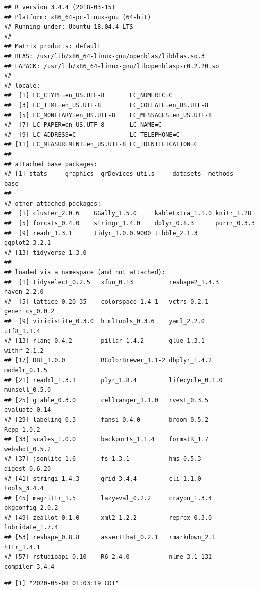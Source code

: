 \documentclass[]{article}
\begin{document}
\begin{verbatim}
## R version 3.4.4 (2018-03-15)
## Platform: x86_64-pc-linux-gnu (64-bit)
## Running under: Ubuntu 18.04.4 LTS
## 
## Matrix products: default
## BLAS: /usr/lib/x86_64-linux-gnu/openblas/libblas.so.3
## LAPACK: /usr/lib/x86_64-linux-gnu/libopenblasp-r0.2.20.so
## 
## locale:
##  [1] LC_CTYPE=en_US.UTF-8       LC_NUMERIC=C              
##  [3] LC_TIME=en_US.UTF-8        LC_COLLATE=en_US.UTF-8    
##  [5] LC_MONETARY=en_US.UTF-8    LC_MESSAGES=en_US.UTF-8   
##  [7] LC_PAPER=en_US.UTF-8       LC_NAME=C                 
##  [9] LC_ADDRESS=C               LC_TELEPHONE=C            
## [11] LC_MEASUREMENT=en_US.UTF-8 LC_IDENTIFICATION=C       
## 
## attached base packages:
## [1] stats     graphics  grDevices utils     datasets  methods   base     
## 
## other attached packages:
##  [1] cluster_2.0.6    GGally_1.5.0     kableExtra_1.1.0 knitr_1.28      
##  [5] forcats_0.4.0    stringr_1.4.0    dplyr_0.8.3      purrr_0.3.3     
##  [9] readr_1.3.1      tidyr_1.0.0.9000 tibble_2.1.3     ggplot2_3.2.1   
## [13] tidyverse_1.3.0 
## 
## loaded via a namespace (and not attached):
##  [1] tidyselect_0.2.5   xfun_0.13          reshape2_1.4.3     haven_2.2.0       
##  [5] lattice_0.20-35    colorspace_1.4-1   vctrs_0.2.1        generics_0.0.2    
##  [9] viridisLite_0.3.0  htmltools_0.3.6    yaml_2.2.0         utf8_1.1.4        
## [13] rlang_0.4.2        pillar_1.4.2       glue_1.3.1         withr_2.1.2       
## [17] DBI_1.0.0          RColorBrewer_1.1-2 dbplyr_1.4.2       modelr_0.1.5      
## [21] readxl_1.3.1       plyr_1.8.4         lifecycle_0.1.0    munsell_0.5.0     
## [25] gtable_0.3.0       cellranger_1.1.0   rvest_0.3.5        evaluate_0.14     
## [29] labeling_0.3       fansi_0.4.0        broom_0.5.2        Rcpp_1.0.2        
## [33] scales_1.0.0       backports_1.1.4    formatR_1.7        webshot_0.5.2     
## [37] jsonlite_1.6       fs_1.3.1           hms_0.5.3          digest_0.6.20     
## [41] stringi_1.4.3      grid_3.4.4         cli_1.1.0          tools_3.4.4       
## [45] magrittr_1.5       lazyeval_0.2.2     crayon_1.3.4       pkgconfig_2.0.2   
## [49] zeallot_0.1.0      xml2_1.2.2         reprex_0.3.0       lubridate_1.7.4   
## [53] reshape_0.8.8      assertthat_0.2.1   rmarkdown_2.1      httr_1.4.1        
## [57] rstudioapi_0.10    R6_2.4.0           nlme_3.1-131       compiler_3.4.4
\end{verbatim}

\begin{verbatim}
## [1] "2020-05-08 01:03:19 CDT"
\end{verbatim}
\end{document}
